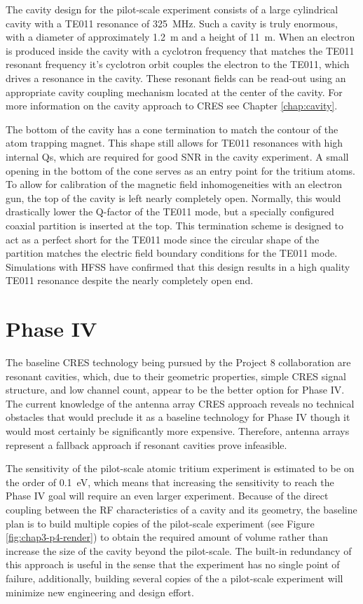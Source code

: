 The cavity design for the pilot-scale experiment consists of a large cylindrical cavity with a TE011 resonance of 325~MHz. Such a cavity is truly enormous, with a diameter of approximately 1.2~m and a height of 11~m. When an electron is produced inside the cavity with a cyclotron frequency that matches the TE011 resonant frequency it's cyclotron orbit couples the electron to the TE011, which drives a resonance in the cavity. These resonant fields can be read-out using an appropriate cavity coupling mechanism located at the center of the cavity. For more information on the cavity approach to CRES see Chapter \ref{chap:cavity}.

The bottom of the cavity has a cone termination to match the contour of the atom trapping magnet. This shape still allows for TE011 resonances with high internal Qs, which are required for good SNR in the cavity experiment. A small opening in the bottom of the cone serves as an entry point for the tritium atoms. To allow for calibration of the magnetic field inhomogeneities with an electron gun, the top of the cavity is left nearly completely open. Normally, this would drastically lower the Q-factor of the TE011 mode, but a specially configured coaxial partition is inserted at the top. This termination scheme is designed to act as a perfect short for the TE011 mode since the circular shape of the partition matches the electric field boundary conditions for the TE011 mode. Simulations with HFSS have confirmed that this design results in a high quality TE011 resonance despite the nearly completely open end.

\section{Phase IV}

The baseline CRES technology being pursued by the Project 8 collaboration are resonant cavities, which, due to their geometric properties, simple CRES signal structure, and low channel count, appear to be the better option for Phase IV. The current knowledge of the antenna array CRES approach reveals no technical obstacles that would preclude it as a baseline technology for Phase IV though it would most certainly be significantly more expensive. Therefore, antenna arrays represent a fallback approach if resonant cavities prove infeasible.

The sensitivity of the pilot-scale atomic tritium experiment is estimated to be on the order of 0.1~eV, which means that increasing the sensitivity to reach the Phase IV goal will require an even larger experiment. Because of the direct coupling between the RF characteristics of a cavity and its geometry, the baseline plan is to build multiple copies of the pilot-scale experiment (see Figure \ref{fig:chap3-p4-render}) to obtain the required amount of volume rather than increase the size of the cavity beyond the pilot-scale. The built-in redundancy of this approach is useful in the sense that the experiment has no single point of failure, additionally, building several copies of the a pilot-scale experiment will minimize new engineering and design effort.


